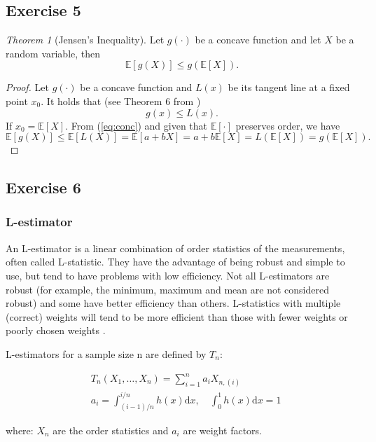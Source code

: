 \documentclass[11pt]{article}
\theoremstyle{definition}
\theoremstyle{remark}
\theoremstyle{remark}
\newtheorem{theorem}{Theorem}[section]
\newcommand{\E}[1]{\mathbb{E}\left[#1 \right]}
\begin{document}
\subsection*{Exercise 5}
\begin{theorem}[Jensen's Inequality]
  Let $g(\cdot)$ be a concave function and let $X$ be a random
  variable, then
\[
  \E{g(X)} \leq g(\E{X}).
\]
\end{theorem}

\begin{proof}
  Let $g(\cdot)$ be a concave function and $L(x)$ be its tangent line
  at a fixed point $x_0$. It holds that (see Theorem 6 from
  \cite{nachbar2018concave})
\begin{equation}\label{eq:conc}
  g(x) \leq L(x).
\end{equation}
If $x_0=\E{X}$. From (\ref{eq:conc}) and given that $\E{\cdot}$
preserves order, we have
\[
  \E{g(X)} \leq \E{L(X)} = \E{a+bX} = a + b\E{X} = L(\E{X}) =
  g(\E{X}).
\]
\end{proof}

\subsection{Exercise 6}

\subsubsection*{ L-estimator }

An L-estimator is  a linear combination of order statistics of the measurements,
often called L-statistic. They have the
advantage of being robust and simple to use, but tend to have problems
with low efficiency. Not all L-estimators are robust (for example, the
minimum, maximum and mean are not considered robust) and some have
better efficiency than others. L-statistics with multiple (correct)
weights will tend to be more efficient than those with fewer weights
or poorly chosen weights \cite{andersen2008modern}.

L-estimators for a sample size n are defined by $T_n$:

\begin{align*}
  &T_{n}\left(X_{1}, \ldots, X_{n}\right)=\sum_{i=1}^{n} a_{i} X_{n,(i)}\\
  &a_{i}=\int_{(i-1) / n}^{i / n} h(x) \mathrm{d} x, \quad
  \int_{0}^{1} h(x) \mathrm{d} x=1
\end{align*}

where: $X_{n}$ are the order statistics and $a_{i}$ are weight
factors.
\end{document}
